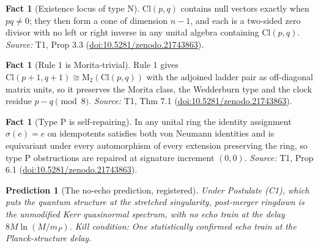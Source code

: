 \documentclass[11pt]{article}
\newtheorem{prediction}[theorem]{Prediction}
\theoremstyle{definition}
\newtheorem{fact}[theorem]{Fact}
\theoremstyle{plain}
\providecommand{\Cl}{}\renewcommand{\Cl}{\mathrm{Cl}}
\providecommand{\Mat}{}\renewcommand{\Mat}{\mathrm{M}}
\begin{document}
\begin{fact}[Existence locus of type N]\label{c:transport.existence-locus-type-n}
$\Cl(p,q)$ contains null vectors exactly when $pq \neq 0$; they then form a cone of dimension $n - 1$, and each is a two-sided zero divisor with no left or right inverse in any unital algebra containing $\Cl(p,q)$.
\emph{Source:} T1, Prop 3.3 (\href{https://doi.org/10.5281/zenodo.21743863}{doi:10.5281/zenodo.21743863}).
\end{fact}

\begin{fact}[Rule 1 is Morita-trivial]\label{c:transport.rule-1-morita-trivial}
Rule 1 gives $\Cl(p+1, q+1) \cong \Mat_2(\Cl(p,q))$ with the adjoined ladder pair as off-diagonal matrix units, so it preserves the Morita class, the Wedderburn type and the clock residue $p - q \pmod 8$.
\emph{Source:} T1, Thm 7.1 (\href{https://doi.org/10.5281/zenodo.21743863}{doi:10.5281/zenodo.21743863}).
\end{fact}

\begin{fact}[Type P is self-repairing]\label{c:transport.type-p-self-repairing}
In any unital ring the identity assignment $\sigma(e) = e$ on idempotents satisfies both von Neumann identities and is equivariant under every automorphism of every extension preserving the ring, so type P obstructions are repaired at signature increment $(0,0)$.
\emph{Source:} T1, Prop 6.1 (\href{https://doi.org/10.5281/zenodo.21743863}{doi:10.5281/zenodo.21743863}).
\end{fact}

\begin{prediction}[The no-echo prediction, registered]\label{c:scrambling.no-echo-prediction-registered}
Under Postulate (C1), which puts the quantum structure at the stretched singularity, post-merger ringdown is the unmodified Kerr quasinormal spectrum, with no echo train at the delay $8M\ln(M/m_P)$.
\emph{Kill condition:} One statistically confirmed echo train at the Planck-structure delay.
\end{prediction}
\end{document}
